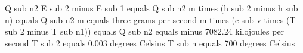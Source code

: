 Q sub n2  
E sub 2 minus E sub 1 equals Q sub n2  
m times (h sub 2 minus h sub n) equals Q sub n2  
m equals three grams per second  
m times (c sub v times (T sub 2 minus T sub n1)) equals Q sub n2 equals minus 7082.24 kilojoules per second  
T sub 2 equals 0.003 degrees Celsius  
T sub n equals 700 degrees Celsius